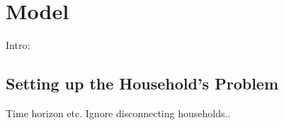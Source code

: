 \documentclass[12pt]{article}
\begin{document}

\pagebreak

\section{Model}

Intro:

\subsection{Setting up the Household's Problem}

Time horizon etc.  Ignore disconnecting households.. 
\end{document}

